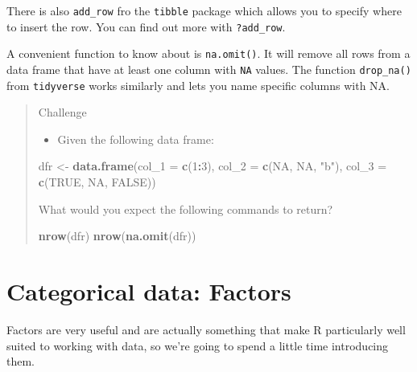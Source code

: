 \documentclass[
]{book}
\newenvironment{Shaded}{\begin{snugshade}}{\end{snugshade}}
\newcommand{\AttributeTok}[1]{\textcolor[rgb]{0.13,0.29,0.53}{#1}}
\newcommand{\ConstantTok}[1]{\textcolor[rgb]{0.56,0.35,0.01}{#1}}
\newcommand{\DecValTok}[1]{\textcolor[rgb]{0.00,0.00,0.81}{#1}}
\newcommand{\FunctionTok}[1]{\textcolor[rgb]{0.13,0.29,0.53}{\textbf{#1}}}
\newcommand{\NormalTok}[1]{#1}
\newcommand{\OtherTok}[1]{\textcolor[rgb]{0.56,0.35,0.01}{#1}}
\newcommand{\SpecialCharTok}[1]{\textcolor[rgb]{0.81,0.36,0.00}{\textbf{#1}}}
\newcommand{\StringTok}[1]{\textcolor[rgb]{0.31,0.60,0.02}{#1}}
\providecommand{\tightlist}{%
  \setlength{\itemsep}{0pt}\setlength{\parskip}{0pt}}
\begin{document}
There is also \texttt{add\_row} fro the \texttt{tibble} package which allows you to specify where to insert the row. You can find out more with \texttt{?add\_row}.

A convenient function to know about is \texttt{na.omit()}. It will remove all rows from a data frame that have at least one column with \texttt{NA} values. The function \texttt{drop\_na()} from \texttt{tidyverse} works similarly and lets you name specific columns with NA.

\begin{quote}
Challenge

\begin{itemize}
\tightlist
\item
  Given the following data frame:
\end{itemize}

\begin{Shaded}
\begin{Highlighting}[]
\NormalTok{dfr }\OtherTok{\textless{}{-}} \FunctionTok{data.frame}\NormalTok{(}\AttributeTok{col\_1 =} \FunctionTok{c}\NormalTok{(}\DecValTok{1}\SpecialCharTok{:}\DecValTok{3}\NormalTok{), }
                  \AttributeTok{col\_2 =} \FunctionTok{c}\NormalTok{(}\ConstantTok{NA}\NormalTok{, }\ConstantTok{NA}\NormalTok{, }\StringTok{"b"}\NormalTok{), }
                  \AttributeTok{col\_3 =} \FunctionTok{c}\NormalTok{(}\ConstantTok{TRUE}\NormalTok{, }\ConstantTok{NA}\NormalTok{, }\ConstantTok{FALSE}\NormalTok{))}
\end{Highlighting}
\end{Shaded}

What would you expect the following commands to return?

\begin{Shaded}
\begin{Highlighting}[]
\FunctionTok{nrow}\NormalTok{(dfr)}
\FunctionTok{nrow}\NormalTok{(}\FunctionTok{na.omit}\NormalTok{(dfr))}
\end{Highlighting}
\end{Shaded}
\end{quote}

\section{Categorical data: Factors}\label{categorical-data-factors}

Factors are very useful and are actually
something that make R particularly well suited to working with data, so we're
going to spend a little time introducing them.
\end{document}
